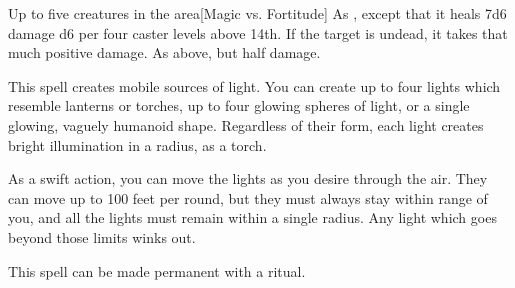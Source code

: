 \begin{spellheader}
\end{spellheader}
\begin{spelleffects}
    \begin{spelltargets}{Up to five creatures in the area}[Magic vs. Fortitude]
        \spelleffect As , except that it heals 7d6 damage \add d6 per four caster levels above 14th.
        \spellsuccess If the target is undead, it takes that much positive damage.
        \spellfailure As above, but half damage.
    \end{spelltargets}
\end{spelleffects}
\begin{spellfooter}
    
\end{spellfooter}

\begin{comment}
\subsubsection{D}
\end{comment}

\begin{spellheader}
    \spelldur{\durshort \dismissable}
\end{spellheader}
\begin{spelleffects}
    \spelleffect This spell creates mobile sources of light. You can create up to four lights which resemble lanterns or torches, up to four glowing spheres of light, or a single glowing, vaguely humanoid shape. Regardless of their form, each light creates bright illumination in a \areamed radius, as a torch.

    As a swift action, you can move the lights as you desire through the air. They can move up to 100 feet per round, but they must always stay within range of you, and all the lights must remain within a single \areamed radius. Any light which goes beyond those limits winks out.
\end{spelleffects}
\begin{spellfooter}
    \spellnotes This spell can be made permanent with a  ritual.
\end{spellfooter}

